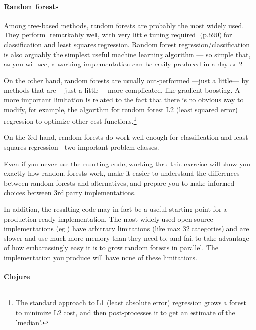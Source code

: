\documentclass[11pt,openany,american,usenames,dvipsnames,svgnames,x11names,table,isodate]{article}
\numberwithin{equation}{section}
\numberwithin{figure}{section}
\begin{document}
\paragraph{Random forests}

Among tree-based methods, random forests are probably the most widely
used. They perform 'remarkably well, with very little tuning required'
(p.590\cite{hastie-tibshirani-friedman-2009}) for classification
and least squares regression. Random forest regression/classification
is also arguably the simplest useful machine learning algorithm ---
so simple that, as you will see, a working implementation can be easily
produced in a day or 2.

On the other hand, random forests are usually out-performed ---just
a little--- by methods that are ---just a little--- more complicated,
like gradient boosting. A more important limitation is related to
the fact that there is no obvious way to modify, for example, the
algorithm for random forest L2 (least squared error) regression to
optimize other cost functions.\footnote{The standard approach to L1 
(least absolute error) regression grows a forest to minimize L2 cost, 
and then post-processes it to get an estimate of the 
'median'.\cite{Meinshausen:2006:QRF:1248547.1248582}}

On the 3rd hand, random forests do work well enough for classification
and least squares regression---two important problem classes. 

Even if you never use the resulting code, working thru this exercise
will show you exactly how random forests work, make it easier to understand
the differences between random forests and alternatives, and prepare
you to make informed choices between 3rd party implementations.

In addition, the resulting code may in fact be a useful starting point
for a production-ready implementation. The most widely used open source
implementations (eg \cite{r-randomForest}) have arbitrary limitations
(like max 32 categories) and are slower and use much more memory than
they need to, and fail to take advantage of how embarassingly easy
it is to grow random forests in parallel. The implementation you produce
will have none of these limitations.


\paragraph{Clojure}
\end{document}
